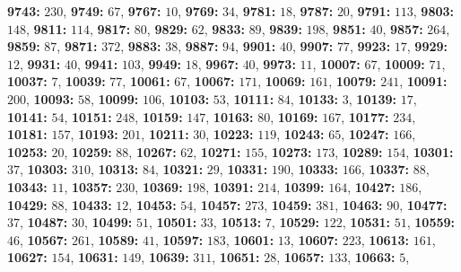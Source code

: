 \textsf{\bfseries 9743:} $230$, \textsf{\bfseries 9749:} $67$, \textsf{\bfseries 9767:} $10$, \textsf{\bfseries 9769:} $34$, \textsf{\bfseries 9781:} $18$, \textsf{\bfseries 9787:} $20$, \textsf{\bfseries 9791:} $113$, \textsf{\bfseries 9803:} $148$, \textsf{\bfseries 9811:} $114$, \textsf{\bfseries 9817:} $80$, \textsf{\bfseries 9829:} $62$, \textsf{\bfseries 9833:} $89$, \textsf{\bfseries 9839:} $198$, \textsf{\bfseries 9851:} $40$, \textsf{\bfseries 9857:} $264$, \textsf{\bfseries 9859:} $87$, \textsf{\bfseries 9871:} $372$, \textsf{\bfseries 9883:} $38$, \textsf{\bfseries 9887:} $94$, \textsf{\bfseries 9901:} $40$, \textsf{\bfseries 9907:} $77$, \textsf{\bfseries 9923:} $17$, \textsf{\bfseries 9929:} $12$, \textsf{\bfseries 9931:} $40$, \textsf{\bfseries 9941:} $103$, \textsf{\bfseries 9949:} $18$, \textsf{\bfseries 9967:} $40$, \textsf{\bfseries 9973:} $11$, \textsf{\bfseries 10007:} $67$, \textsf{\bfseries 10009:} $71$, \textsf{\bfseries 10037:} $7$, \textsf{\bfseries 10039:} $77$, \textsf{\bfseries 10061:} $67$, \textsf{\bfseries 10067:} $171$, \textsf{\bfseries 10069:} $161$, \textsf{\bfseries 10079:} $241$, \textsf{\bfseries 10091:} $200$, \textsf{\bfseries 10093:} $58$, \textsf{\bfseries 10099:} $106$, \textsf{\bfseries 10103:} $53$, \textsf{\bfseries 10111:} $84$, \textsf{\bfseries 10133:} $3$, \textsf{\bfseries 10139:} $17$, \textsf{\bfseries 10141:} $54$, \textsf{\bfseries 10151:} $248$, \textsf{\bfseries 10159:} $147$, \textsf{\bfseries 10163:} $80$, \textsf{\bfseries 10169:} $167$, \textsf{\bfseries 10177:} $234$, \textsf{\bfseries 10181:} $157$, \textsf{\bfseries 10193:} $201$, \textsf{\bfseries 10211:} $30$, \textsf{\bfseries 10223:} $119$, \textsf{\bfseries 10243:} $65$, \textsf{\bfseries 10247:} $166$, \textsf{\bfseries 10253:} $20$, \textsf{\bfseries 10259:} $88$, \textsf{\bfseries 10267:} $62$, \textsf{\bfseries 10271:} $155$, \textsf{\bfseries 10273:} $173$, \textsf{\bfseries 10289:} $154$, \textsf{\bfseries 10301:} $37$, \textsf{\bfseries 10303:} $310$, \textsf{\bfseries 10313:} $84$, \textsf{\bfseries 10321:} $29$, \textsf{\bfseries 10331:} $190$, \textsf{\bfseries 10333:} $166$, \textsf{\bfseries 10337:} $88$, \textsf{\bfseries 10343:} $11$, \textsf{\bfseries 10357:} $230$, \textsf{\bfseries 10369:} $198$, \textsf{\bfseries 10391:} $214$, \textsf{\bfseries 10399:} $164$, \textsf{\bfseries 10427:} $186$, \textsf{\bfseries 10429:} $88$, \textsf{\bfseries 10433:} $12$, \textsf{\bfseries 10453:} $54$, \textsf{\bfseries 10457:} $273$, \textsf{\bfseries 10459:} $381$, \textsf{\bfseries 10463:} $90$, \textsf{\bfseries 10477:} $37$, \textsf{\bfseries 10487:} $30$, \textsf{\bfseries 10499:} $51$, \textsf{\bfseries 10501:} $33$, \textsf{\bfseries 10513:} $7$, \textsf{\bfseries 10529:} $122$, \textsf{\bfseries 10531:} $51$, \textsf{\bfseries 10559:} $46$, \textsf{\bfseries 10567:} $261$, \textsf{\bfseries 10589:} $41$, \textsf{\bfseries 10597:} $183$, \textsf{\bfseries 10601:} $13$, \textsf{\bfseries 10607:} $223$, \textsf{\bfseries 10613:} $161$, \textsf{\bfseries 10627:} $154$, \textsf{\bfseries 10631:} $149$, \textsf{\bfseries 10639:} $311$, \textsf{\bfseries 10651:} $28$, \textsf{\bfseries 10657:} $133$, \textsf{\bfseries 10663:} $5$, 
